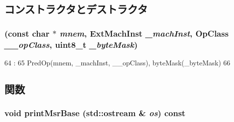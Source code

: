 \subsection{コンストラクタとデストラクタ}
\hypertarget{classMsrBase_a79fafc489c6b875f952c43514d1f714b}{
\subsubsection[{MsrBase}]{ (const char $\ast$ {\em mnem}, \/  {\bf ExtMachInst} {\em \_\-machInst}, \/  OpClass {\em \_\-\_\-opClass}, \/  uint8\_\-t {\em \_\-byteMask})}}
\label{classMsrBase_a79fafc489c6b875f952c43514d1f714b}



\begin{DoxyCode}
64                                :
65         PredOp(mnem, _machInst, __opClass), byteMask(_byteMask)
66     {}

\end{DoxyCode}


\subsection{関数}
\hypertarget{classMsrBase_ad199fe95a1c0915252b3b46eaacd1515}{
\subsubsection[{printMsrBase}]{\setlength{\rightskip}{0pt plus 5cm}void printMsrBase (std::ostream \& {\em os}) const}}
\label{classMsrBase_ad199fe95a1c0915252b3b46eaacd1515}




